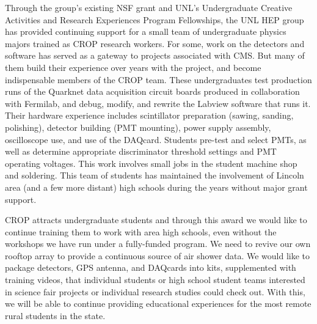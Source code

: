 Through the group's existing NSF grant and UNL's Undergraduate Creative Activities and Research Experiences Program  Fellowships, the UNL HEP group has provided continuing support for a small team of undergraduate physics majors trained as CROP research workers.  For some, work on the detectors and software has served as a gateway to projects associated with CMS.  But many of them build their experience over years with the project, and become indispensable members of the CROP team.  These undergraduates test production runs of the Quarknet data acquisition circuit boards produced in collaboration with Fermilab, and debug, modify, and rewrite the Labview software that runs it.  Their hardware experience includes scintillator preparation (sawing, sanding, polishing), detector building (PMT mounting), power supply assembly, oscilloscope use, and use of the DAQcard. Students pre-test and select PMTs, as well as determine appropriate discriminator threshold settings and PMT operating voltages.  This work involves small jobs in the student machine shop and soldering. This team of students has maintained the involvement of Lincoln area (and a few more distant) high schools during the years without major grant support.

CROP attracts undergraduate students and through this award we would like to continue training them to work with area high schools, even without the workshops we have run under a fully-funded program. We need to revive our own rooftop array to provide a continuous source of air shower data. We would like to package detectors, GPS antenna, and DAQcards into kits, supplemented with training videos, that individual students or high school student teams interested in science fair projects or individual research studies could check out.  
With this, we will be able to continue providing educational experiences for the most remote rural students in the state.

